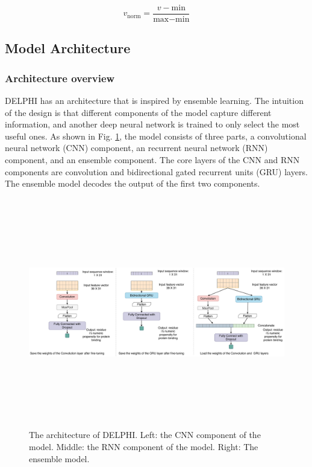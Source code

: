 \begin{equation}
v_\text{norm}=\dfrac{v-\text{min}}{\text{max}-\text{min}}\label{eq_normalized}
\end{equation}

\subsection{Model Architecture}
\subsubsection{Architecture overview}
DELPHI has an architecture that is inspired by ensemble learning. The intuition of the design is that different components of the model capture different information, and another deep neural network is trained to only select the most useful ones. As shown in Fig. \ref{fig_architecture}, the model consists of three parts, a convolutional neural network (CNN) component, an recurrent neural network (RNN) component, and an ensemble component. The core layers of the CNN and RNN components are convolution and bidirectional gated recurrent units (GRU) layers. The ensemble model decodes the output of the first two components.  

\begin{figure}
\centering
\includegraphics[width=\textwidth, height=10cm]{img/Model_architecture.pdf}
\caption[The architecture of DELPHI]{The architecture of DELPHI. Left: the CNN component of the model. Middle: the RNN component of the model. Right: The ensemble model. 
  \label{fig_architecture}}
\end{figure}
